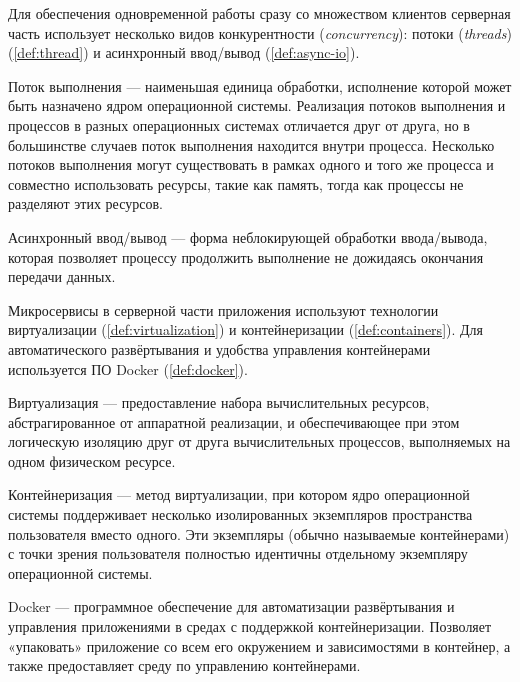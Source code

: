 \noindent Для обеспечения одновременной работы сразу со множеством клиентов серверная часть использует несколько видов
конкурентности (\textit{concurrency}): потоки (\textit{threads}) (\ref{def:thread}) и асинхронный ввод/вывод
(\ref{def:async-io}).

\begin{definition}
    \label{def:thread}
    Поток выполнения — наименьшая единица обработки, исполнение которой может быть назначено ядром операционной системы.
    Реализация потоков выполнения и процессов в разных операционных системах отличается друг от друга, но в большинстве
    случаев поток выполнения находится внутри процесса. Несколько потоков выполнения могут существовать в рамках одного
    и того же процесса и совместно использовать ресурсы, такие как память, тогда как процессы не разделяют этих ресурсов.
\end{definition}

\begin{definition}
    \label{def:async-io}
    Асинхронный ввод/вывод — форма неблокирующей обработки ввода/вывода, которая позволяет процессу
    продолжить выполнение не дожидаясь окончания передачи данных.
\end{definition}

\noindent Микросервисы в серверной части приложения используют технологии виртуализации (\ref{def:virtualization}) и
контейнеризации (\ref{def:containers}). Для автоматического развёртывания и удобства управления контейнерами используется
ПО Docker (\ref{def:docker}).

\begin{definition}
    \label{def:virtualization}
    Виртуализация — предоставление набора вычислительных ресурсов, абстрагированное от аппаратной реализации,
    и обеспечивающее при этом логическую изоляцию друг от друга вычислительных процессов, выполняемых на одном
    физическом ресурсе. 
\end{definition}

\begin{definition}
    \label{def:containers}
    Контейнеризация — метод виртуализации, при котором ядро операционной системы поддерживает несколько изолированных
    экземпляров пространства пользователя вместо одного. Эти экземпляры (обычно называемые контейнерами) с точки зрения
    пользователя полностью идентичны отдельному экземпляру операционной системы.
\end{definition}

\begin{definition}
    \label{def:docker}
    Docker — программное обеспечение для автоматизации развёртывания и управления приложениями в средах с
    поддержкой контейнеризации. Позволяет «упаковать» приложение со всем его окружением и зависимостями в контейнер,
    а также предоставляет среду по управлению контейнерами.
\end{definition}

